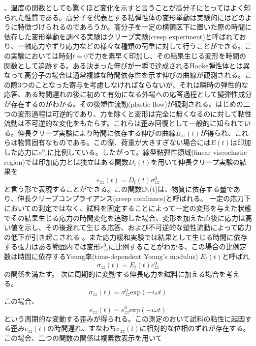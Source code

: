 、温度の関数としても驚くほど変化を示すと言うことが高分子にとってはよく知られた性質である。高分子を代表とする粘弾性体の変形挙動は実験的にはどのように特徴づけられるのであろうか。高分子を一定の横領区下に置いた際の時間に依存した変形挙動を調べる実験はクリープ実験(creep experiment)と呼ばれており、一軸応力やずり応力などの様々な種類の荷重に対して行うことができる。この実験においては時刻$t=0$で力を素早く印加し、その結果生じる変形を時間の関数として追跡する。ある決まった伸びが一瞬で達成されるHooke弾性体とは異なって高分子の場合は通常複雑な時間依存性を示す伸びの曲線が観測される。この際3つのことなった寄与を考慮しなければならないが、それは瞬時の弾性的な応答、ある時間遅れの後に初めて有効になる外場への応答過程として擬弾性成分が存在するのがわかる。その後塑性流動(plastic flow)が観測される。はじめの二つの変形過程は可逆的であり、力を除くと変形は完全に無くなるのに対して粘性流動は不可逆的な変化をもたらす。これらは歪み回復として一般的に知られている。伸長クリープ実験により時間に依存する伸びの曲線$E_{zz}(t)$が得られ、これらは物質固有なものである。この際、荷重が大きすぎない場合には$E(t)$は印加した応力に$\sigma_{zz}^0$に比例している。したがって。線型粘弾性領域(linear viscoelastic region)では印加応力とは独立はある関数$D_t(t)$を用いて伸長クリープ実験の結果を
\begin{equation}
e_{zz}(t) = D_t(t)\sigma_{zz}^0
\end{equation}
と言う形で表現することができる。この関数Dt(t)は、物質に依存する量であり、伸長クリープコンプライアンス(creep comliance)と呼ばれる。
一定の応力下においての測定ではなく、試料を固定することによって一定の変形を与えた状態でその結果生じる応力の時間変化を追跡した場合、変形を加えた直後に応力は高い値を示し、その後遅れて生じる応答、および不可逆的な塑性流動によって応力の低下が引き起こされる
。また応力緩和実験では結果として生じる時間に依存する張力はある範囲内では変形$e_{zz}^0$に比例することがわかる、この場合の比例定数は時間に依存するYoung率(time-dependent Young's modulus) $E_t(t)$と呼ばれ
\begin{equation}
  \sigma_{zz}(t) = E_t(t)e_{zz}^0  
\end{equation}
の関係を満たす。
次に周期的に変動する伸長応力を試料に加える場合を考える。
\begin{equation}
    \sigma_{zz}(t) = \sigma_{zz}^0\mathrm{exp}(-i \omega t)
\end{equation}
この場合、
\begin{equation}
    e_{zz}(t) = e_{zz}^0\mathrm{exp}(-i \omega t)
\end{equation}
という周期的な変動する歪みが得られる。この測定のおいて試料の粘性に起因する歪み$e_{zz}(t)$の時間遅れ、すなわち$\sigma_{zz}(t)$に相対的な位相のずれが存在する。この場合、二つの関数の関係は複素数表示を用いて
